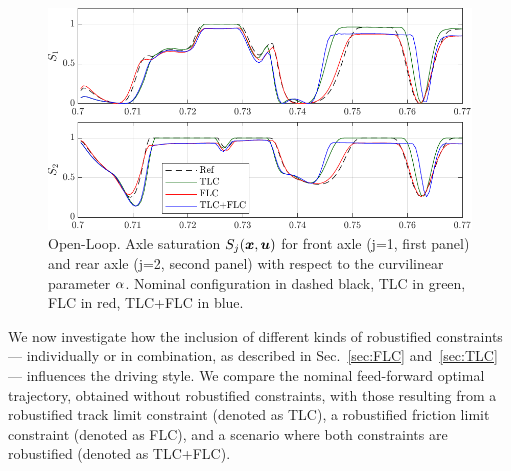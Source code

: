 \begin{figure}[t]
	\centering
	\includegraphics[scale = 1]{Fig/ol_saturation.pdf}
	\caption{Open-Loop. Axle saturation $S_j(\boldsymbol{x},\boldsymbol{u})$ for front axle (j=1, first panel) and rear axle (j=2, second panel) with respect to the curvilinear parameter $\alpha$. Nominal configuration in dashed black, TLC in green, FLC in red, TLC+FLC in blue.
	}
	\label{fig:ol_saturation}
\end{figure}

We now investigate how the inclusion of different kinds of robustified constraints --- individually or in combination, as described in Sec.~\ref{sec:FLC} and~\ref{sec:TLC} --- influences the driving style.
We compare the nominal feed-forward optimal trajectory, obtained without robustified constraints, with those resulting from a robustified track limit constraint (denoted as TLC), a robustified friction limit constraint (denoted as FLC), and a scenario where both constraints are robustified (denoted as TLC+FLC).

